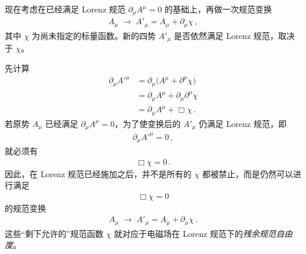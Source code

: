 \begin{derivationnote}
现在考虑在已经满足 Lorenz 规范 $\partial_{\mu}A^{\mu}=0$ 的基础上，再做一次规范变换
\begin{align}
A_{\mu} \;\longrightarrow\; A'_{\mu}
=
A_{\mu} + \partial_{\mu}\chi\,,
\end{align}
其中 $\chi$ 为尚未指定的标量函数。新的四势 $A'_{\mu}$ 是否依然满足 Lorenz 规范，取决于 $\chi$。

先计算
\begin{align}
\partial_{\mu}A'^{\mu}
&=
\partial_{\mu}\big(A^{\mu} + \partial^{\mu}\chi\big)
\\[0.3em]
&=
\partial_{\mu}A^{\mu}
+
\partial_{\mu}\partial^{\mu}\chi
\\[0.3em]
&=
\partial_{\mu}A^{\mu}
+
\Box\chi\,.
\end{align}
若原势 $A_{\mu}$ 已经满足 $\partial_{\mu}A^{\mu}=0$，为了使变换后的 $A'_{\mu}$ 仍满足 Lorenz 规范，即
\begin{align}
\partial_{\mu}A'^{\mu} = 0\,,
\end{align}
就必须有
\begin{align}
\Box\chi = 0\,.
\end{align}
因此，在 Lorenz 规范已经施加之后，并不是所有的 $\chi$ 都被禁止，而是仍然可以进行满足
\begin{align}
\Box\chi = 0
\end{align}
的规范变换
\begin{align}
A_{\mu} \;\longrightarrow\; A'_{\mu}
=
A_{\mu} + \partial_{\mu}\chi\,.
\end{align}
这些“剩下允许的”规范函数 $\chi$ 就对应于电磁场在 Lorenz 规范下的\emph{残余规范自由度}。
\end{derivationnote}



